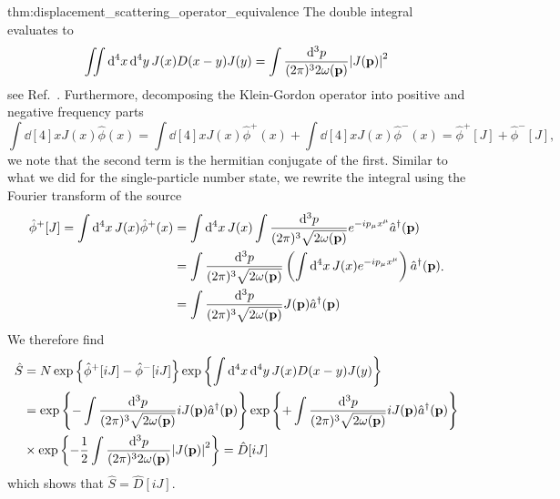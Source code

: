 \begin{delayedproof}{thm:displacement_scattering_operator_equivalence}
	The double integral evaluates to
	\begin{equation}
		\iint\dd[4]{x}\dd[4]{y}
		J(x)
		D(x-y)
		J(y)
		=
		\int\frac{\dd[3]{p}}{(2\pi)^32\omega(\vb{p})}
		\abs{J(\vb{p})}^2
	\end{equation}
	see Ref.~\cite[p.~26]{Zee2010}.
	Furthermore, decomposing the Klein-Gordon operator into positive and negative frequency parts
	\begin{equation}
		\int\dd[4]{x}
		J(x)
		\hat\phi(x)
		=
		\int\dd[4]{x}
		J(x)
		\hat\phi^+(x)
		+
		\int\dd[4]{x}
		J(x)
		\hat\phi^-(x)
		=
		\hat\phi^+[J]
		+
		\hat\phi^-[J]
		,
	\end{equation}
	we note that the second term is the hermitian conjugate of the first.
	Similar to what we did for the single-particle number state, we rewrite the integral using the Fourier transform of the source
	\begin{equation}
		\begin{split}
			\hat\phi^+[J]
			=
			\int\dd[4]{x}
			J(x)
			\hat\phi^+(x)
			&=
			\int\dd[4]{x}
			J(x)
			\int\frac{\dd[3]{p}}{(2\pi)^3\sqrt{2\omega(\vb{p})}}
			e^{-ip_\mu x^\mu}
			\hat{a}^\dagger(\vb{p})
			\\
			&=
			\int\frac{\dd[3]{p}}{(2\pi)^3\sqrt{2\omega(\vb{p})}}
			\left(
				\int\dd[4]{x}
				J(x)
				e^{-ip_\mu x^\mu}
			\right)
			\hat{a}^\dagger(\vb{p})
			\\
			&=
			\int\frac{\dd[3]{p}}{(2\pi)^3\sqrt{2\omega(\vb{p})}}
			J(\vb{p})
			\hat{a}^\dagger(\vb{p})
		\end{split}
		.
	\end{equation}
	We therefore find
	\begin{equation}
		\begin{split}
			\hat{S}
			&=
			N\exp\left\{
				\hat\phi^+[iJ]
				-
				\hat\phi^-[iJ]
			\right\}
			\exp\left\{
				\int\dd[4]{x}\dd[4]{y}
				J(x)
				D(x-y)
				J(y)
			\right\}
			\\
			&=
			\exp\left\{
				-
				\int\frac{\dd[3]{p}}{(2\pi)^3\sqrt{2\omega(\vb{p})}}
				iJ(\vb{p})
				\hat{a}^\dagger(\vb{p})
			\right\}
			\exp\left\{
				+
				\int\frac{\dd[3]{p}}{(2\pi)^3\sqrt{2\omega(\vb{p})}}
				iJ(\vb{p})
				\hat{a}^\dagger(\vb{p})
			\right\}
			\\
			&\times
			\exp\left\{
				-
				\frac{1}{2}
				\int\frac{\dd[3]{p}}{(2\pi)^32\omega(\vb{p})}
				\abs{J(\vb{p})}^2
			\right\}
			=
			\hat{D}[iJ]
		\end{split}
	\end{equation}
	which shows that $\hat{S}=\hat{D}[iJ]$.
\end{delayedproof}